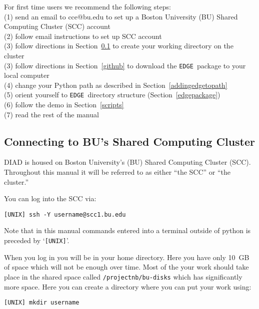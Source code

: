\documentclass{article}
\newcommand{\edge}{\texttt{EDGE }}
\begin{document}
For first time users we recommend the following steps:\\
(1) send an email to cce@bu.edu to set up a Boston University (BU) Shared Computing Cluster (SCC) account \\
(2) follow email instructions to set up SCC account \\
(3) follow directions in Section~\ref{scc} to create your working directory on the cluster \\
(3) follow directions in Section~\ref{github} to download the \edge package to your local computer \\
(4) change your Python path as described in Section~\ref{addingedgetopath}  \\
(5) orient yourself to \edge directory structure (Section~\ref{edgepackage})\\
(6) follow the demo in Section~\ref{scripts} \\
(7) read the rest of the manual

\subsection{Connecting to BU's Shared Computing Cluster} \label{scc}

DIAD is housed on Boston University's (BU) Shared Computing Cluster (SCC).  Throughout this
manual it will be referred to as either ``the SCC'' or ``the cluster.''

\vspace{2mm}

\noindent You can log into the SCC via:

\vspace{2mm}
\texttt{[UNIX] ssh -Y username@scc1.bu.edu}
\vspace{2mm}

\noindent Note that in this manual commands entered into a terminal outside of python is preceded by `\texttt{[UNIX]}'.

\vspace{2mm}

\noindent When you log in you will be in your home directory.  Here you have only 10~GB of space which will not be enough over time. Most of the your work should take place in the shared space called \texttt{/projectnb/bu-disks} which has significantly more space.  Here you can create a directory where you can put your work using:

\vspace{2mm}
\texttt{[UNIX] mkdir username}
\vspace{2mm}
\end{document}
